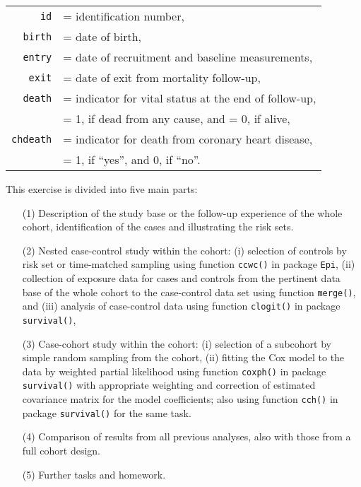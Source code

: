 \begin{center}
\begin{tabular}{r l}
\texttt{id} & = identification number, \\
\texttt{birth} & = date of birth,\\
\texttt{entry} & = date of recruitment and baseline measurements, \\
\texttt{exit} & = date of exit from mortality follow-up,\\
\texttt{death} & = indicator for vital status at the end of follow-up, \\
               & = 1, if dead from any cause, and = 0, if alive, \\
\texttt{chdeath} & = indicator for death from coronary heart disease, \\  
              & = 1, if ``yes'', and 0, if ``no''. \\
\end{tabular}
\end{center}

This exercise is divided into five main parts:
\begin{itemize}
\item[(1)] 
  Description of the study base or the follow-up experience of the
  whole cohort, identification of the cases and illustrating the risk sets. 
\item[(2)]
  Nested case-control study within the cohort: 
  (i) selection of controls by risk set or time-matched sampling
  using function {\tt ccwc()} in package {\tt Epi}, 
  (ii) collection of exposure data for cases and controls 
   from the pertinent data base of the whole cohort to the
  case-control data set using function {\tt merge()}, and (iii)
  analysis of case-control data using function {\tt clogit()}
  in package {\tt survival()},
\item[(3)]
 Case-cohort study within the cohort:
 (i) selection of a subcohort by simple random sampling from
 the cohort,
 (ii) fitting the Cox model to the data by weighted partial
 likelihood using function {\tt coxph()} in package {\tt survival()}
 with appropriate weighting and correction of estimated
 covariance matrix for the model coefficients; also
 using function {\tt cch()} in package {\tt survival()}
 for the same task. %
 \item[(4)]
 Comparison of results from all previous analyses,
 also with those from a full cohort design.
 \item[(5)] 
 Further tasks and homework.
\end{itemize}
 

